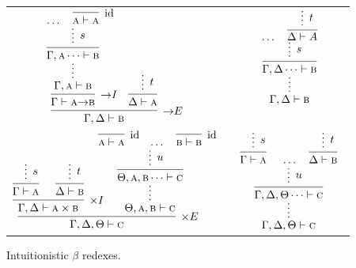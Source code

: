 \begin{figure}
	\centering
	\begin{tabularx}{0.9\textwidth}{@{}c@{~}c@{~}c@{}}
	$\infer[\ii E]{\Gamma, \Delta \vdash \prop{b}}{
	\infer[\ii I]{\Gamma \vdash \prop{a} \ii \prop{b}}{
		\infer*[]{\Gamma, \prop{a} \vdash \prop{b}}{
			\infer[]{\Gamma, \prop{a} \dots \vdash \prop{b}}{
					\infer*[s]{}{\dots & \infer[\Ax]{\prop{a} \vdash \prop{a}}{}}
				}
			}
		}
		&
		\infer{\Delta \vdash \prop{a}}{
			\infer*[t]{}{}
		}
	}$
	&
	\raisebox{20pt}{$\implies$}
	&
	$ 
	\infer*[]{\Gamma, \Delta \vdash \prop{b}}{
		\infer[]{\Gamma, \Delta \dots \vdash \prop{b}}{
			\infer*[s]{}{
			\dots &
			\infer[]{\Delta \vdash A}{
				\infer*[t]{}{}
			}}
		}
	}
	$\\[\smallsep]
	$
	\infer[\times E]{\Gamma, \Delta, \Theta \vdash \prop{c}}{
		\infer[\times I]{\Gamma, \Delta \vdash \prop{a} \times \prop{b}}{
			\infer[]{\Gamma \vdash \prop{a}}{\infer*[s]{}{}}
			&
			\infer[]{\Delta \vdash \prop{b}}{\infer*[t]{}{}}
		}		
		&
		\hspace{-15pt}
		\infer*[]{\Theta, \prop{a}, \prop{b} \vdash \prop{c}}{
			\infer[]{\Theta, \prop{a}, \prop{b}\dots \vdash \prop{c}}{
				\infer*[u]{}{
					\infer[\Ax]{\prop{a} \vdash \prop{a}}{
					}
					&
					\dots
					&
					\infer[\Ax]{\prop{b} \vdash \prop{b}}{}
				}
			}
		}
	}
	$
	&
	\raisebox{20pt}{$\implies$}
	&
	$
	\infer*[]{\Gamma, \Delta, \Theta \vdash \prop{c}}{
		\infer[]{\Gamma, \Delta, \Theta \dots \vdash \prop{c}}{
			\infer*[u]{}{
				\infer[]{\Gamma \vdash \prop{a}}{
					\infer*[s]{}{}
				}
				&
				\dots 
				&
				\infer[]{\Delta \vdash \prop{b}}{
					\infer*[t]{}{}
				}
			}
		}
	} 
	$
	\end{tabularx}	\caption{Intuitionistic $\beta$ redexes.}
	\label{figure:intuitionistic_proof_reduction}
\end{figure}


